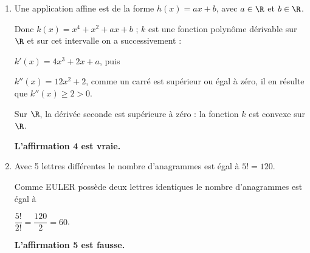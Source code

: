 \begin{enumerate}
\textit{Conclusion} : La relation est vraie au rang 0 et si elle est vraie au rang $n \in \N$, elle l'est aussi au rang $n + 1$ : d'après le principe de récurrence quel que soit $n \in \N, \\\: u_{n+1} < u_n$ : ceci montre que la suite $(u_n)$ est décroissante.

\hfill\textbf{L'affirmation 3 est vraie.}

\item Une application affine est de la forme $h(x) = ax + b$, avec $a \in \R$ et $b \in \R$.

Donc $k(x) = x^4 + x^2 + ax + b$ ; $k$ est une fonction polynôme dérivable sur $\R$ et sur cet intervalle on a successivement :

$k'(x) = 4x^3 + 2x + a$, puis

$k''(x) = 12x^2 + 2$, comme un carré est supérieur ou égal à zéro, il en résulte que $k''(x) \geqslant 2 > 0$.

Sur $\R$, la dérivée seconde est supérieure à zéro : la fonction $k$ est convexe sur $\R$.

\hfill\textbf{L'affirmation 4 est vraie.}

\item Avec 5 lettres différentes le nombre d'anagrammes est égal à $5! = 120$.

Comme EULER possède deux lettres identiques le nombre d'anagrammes est égal à 

$\dfrac{5!}{2!} = \dfrac{120}{2} = 60$.

\hfill\textbf{L'affirmation 5 est fausse.}
\end{enumerate}

